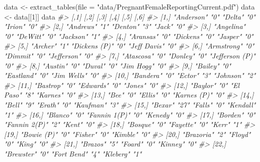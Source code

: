 \documentclass[
  12pt,
]{book}
\newenvironment{Shaded}{\begin{snugshade}}{\end{snugshade}}
\newcommand{\AttributeTok}[1]{\textcolor[rgb]{0.61,0.61,0.61}{#1}}
\newcommand{\CommentTok}[1]{\textcolor[rgb]{0.37,0.37,0.37}{\textit{#1}}}
\newcommand{\DecValTok}[1]{\textcolor[rgb]{0.06,0.06,0.06}{#1}}
\newcommand{\FunctionTok}[1]{\textcolor[rgb]{0,0,0}{#1}}
\newcommand{\NormalTok}[1]{#1}
\newcommand{\OtherTok}[1]{\textcolor[rgb]{0.37,0.37,0.37}{#1}}
\newcommand{\StringTok}[1]{\textcolor[rgb]{0.5,0.5,0.5}{#1}}
\begin{document}
\begin{Shaded}
\begin{Highlighting}[]
\NormalTok{data }\OtherTok{\textless{}{-}} \FunctionTok{extract\_tables}\NormalTok{(}\AttributeTok{file =} \StringTok{"data/PregnantFemaleReportingCurrent.pdf"}\NormalTok{)}
\NormalTok{data }\OtherTok{\textless{}{-}}\NormalTok{ data[[}\DecValTok{1}\NormalTok{]]}
\NormalTok{data}
\CommentTok{\#\textgreater{}       [,1]            [,2] [,3]          [,4] [,5]            [,6]}
\CommentTok{\#\textgreater{}  [1,] "Anderson"      "0"  "Delta"       "0"  "Irion"         "0" }
\CommentTok{\#\textgreater{}  [2,] "Andrews"       "1"  "Denton"      "3"  "Jack"          "0" }
\CommentTok{\#\textgreater{}  [3,] "Angelina"      "0"  "DeWitt"      "0"  "Jackson"       "1" }
\CommentTok{\#\textgreater{}  [4,] "Aransas"       "0"  "Dickens"     "0"  "Jasper"        "0" }
\CommentTok{\#\textgreater{}  [5,] "Archer"        "1"  "Dickens (P)" "0"  "Jeff Davis"    "0" }
\CommentTok{\#\textgreater{}  [6,] "Armstrong"     "0"  "Dimmit"      "0"  "Jefferson"     "0" }
\CommentTok{\#\textgreater{}  [7,] "Atascosa"      "0"  "Donley"      "0"  "Jefferson (P)" "0" }
\CommentTok{\#\textgreater{}  [8,] "Austin"        "0"  "Duval"       "0"  "Jim Hogg"      "0" }
\CommentTok{\#\textgreater{}  [9,] "Bailey"        "0"  "Eastland"    "0"  "Jim Wells"     "0" }
\CommentTok{\#\textgreater{} [10,] "Bandera"       "0"  "Ector"       "3"  "Johnson"       "2" }
\CommentTok{\#\textgreater{} [11,] "Bastrop"       "0"  "Edwards"     "0"  "Jones"         "0" }
\CommentTok{\#\textgreater{} [12,] "Baylor"        "0"  "El Paso"     "8"  "Karnes"        "0" }
\CommentTok{\#\textgreater{} [13,] "Bee"           "0"  "Ellis"       "0"  "Karnes (P)"    "0" }
\CommentTok{\#\textgreater{} [14,] "Bell"          "9"  "Erath"       "0"  "Kaufman"       "3" }
\CommentTok{\#\textgreater{} [15,] "Bexar"         "27" "Falls"       "0"  "Kendall"       "1" }
\CommentTok{\#\textgreater{} [16,] "Blanco"        "0"  "Fannin 1(P)" "0"  "Kenedy"        "0" }
\CommentTok{\#\textgreater{} [17,] "Borden"        "0"  "Fannin 2(P)" "2"  "Kent"          "0" }
\CommentTok{\#\textgreater{} [18,] "Bosque"        "0"  "Fayette"     "0"  "Kerr"          "1" }
\CommentTok{\#\textgreater{} [19,] "Bowie (P)"     "0"  "Fisher"      "0"  "Kimble"        "0" }
\CommentTok{\#\textgreater{} [20,] "Brazoria"      "2"  "Floyd"       "0"  "King"          "0" }
\CommentTok{\#\textgreater{} [21,] "Brazos"        "5"  "Foard"       "0"  "Kinney"        "0" }
\CommentTok{\#\textgreater{} [22,] "Brewster"      "0"  "Fort Bend"   "4"  "Kleberg"       "1" }

\end{Highlighting}
\end{Shaded}
\end{document}
